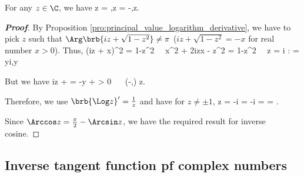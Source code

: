 \begin{proposition}
For any $z\in \C$, we have %
\beast
{}\Arcsin z =  ,\qquad {}\Arccos z =  -,\qquad z\neq {}.
\eeast
\end{proposition}

\begin{proof}[\bf Proof]
By Proposition \ref{pro:principal_value_logarithm_derivative}, we have to pick $z$ such that $\Arg\brb{iz + \sqrt{1-z^2}} \neq \pi$ ($iz + \sqrt{1-z^2} = -x$ for real number $x>0$). Thus,
\be
(iz + x)^2 = 1-z^2 \ \ra\ x^2 + 2izx - z^2 = 1-z^2 \ \ra\ z = i : = yi,\quad y\in \R
\ee

But we have
\be
iz +  = -y +  > 0 \ \ra\ \Arg{} \in (-\pi,\pi) \quad {}z\in \C.
\ee

%

Therefore, we use $\brb{\Log z}' = \frac 1z$ and have for $z\neq \pm 1$,
\be
{}\Arcsin z = -i  \Log{} = -i   =  = .
\ee



Since $\Arccos z = \frac{\pi}2 - \Arcsin z$, we have the required result for inverse cosine.
\end{proof}

\subsection{Inverse tangent function pf complex numbers}

